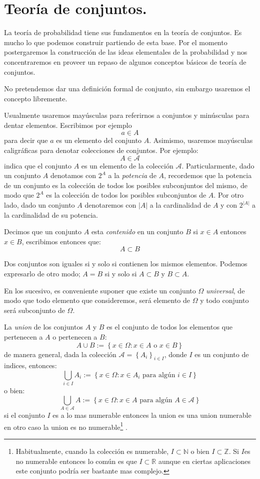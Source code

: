 \documentclass[14pt]{extbook}
\begin{document}
\chapter{Teoría de conjuntos.}

La teoría de probabilidad tiene sus fundamentos en la teoría de conjuntos. Es mucho lo que podemos construir partiendo de esta base. Por el momento postergaremos la construcción de las ideas elementales de la probabilidad y nos concentraremos en proveer un repaso de algunos conceptos básicos de teoría de conjuntos.

No pretendemos dar una definición formal de conjunto, sin embargo usaremos el concepto libremente. 


Usualmente usaremos mayúsculas para referirnos a conjuntos y minúsculas para dentar elementos. Escribimos por ejemplo
$$
a \in A 
$$
para decir que $a$ es un elemento del conjunto $A$. Asimismo, usaremos mayúsculas caligráficas para denotar colecciones de conjuntos. Por ejemplo:
$$
A\in \mathcal{A}
$$
indica que el conjunto $A$ es un elemento de la colección $\mathcal{A}$.
Particularmente, dado un conjunto $A$ denotamos con $2^A$ a la \emph{potencia} de $A$, recordemos que la potencia de un conjunto es la colección de todos los posibles subconjuntos del mismo, de modo que $2^A$ es la colección de todos los posibles subconjuntos de $A$. Por otro lado, dado un conjunto $A$ denotaremos con $\vert A \vert$ a la cardinalidad de $A$ y con $2^{\vert A \vert}$ a la cardinalidad de su potencia.


Decimos que un conjunto $A$ esta \emph{contenido} en un conjunto $B$ si $x\in A$ entonces $x \in B$, escribimos entonces que:
$$
A\subset B
$$

Dos conjuntos son iguales si y solo si contienen los mismos elementos. Podemos expresarlo de otro modo; $A = B$ si y solo si $A\subset B$ y $B \subset A$.

En los sucesivo, es conveniente suponer que existe un conjunto $\Omega$ \emph{universal}, de modo que todo elemento que consideremos, será elemento de $\Omega$ y todo conjunto será subconjunto de $\Omega$.

La \emph{union} de los conjuntos $A$ y $B$ es el conjunto de todos los elementos que pertenecen a $A$ o pertenecen a $B$:
$$
A\cup B := \left\{x \in \Omega: x \in A \text{ o } x \in B\right\}
$$
de manera general, dada la colección $\mathcal{A} = \left\{A_i\right\}_{i\in I}$, donde $I$ es un conjunto de indices, entonces:
$$
\bigcup_{i\in I}A_i := \left\{x \in \Omega: x \in A_i \text{ para algún } i\in I \right\}
$$
\noindent
o bien:
\noindent
$$
\bigcup_{A\in \mathcal{A}}A := \left\{x\in \Omega: x \in A \text{ para algún } A\in \mathcal{A} \right\}
$$
si el conjunto $I$ es a lo mas numerable entonces la union es una union numerable en otro caso la union es no numerable\footnote{Habitualmente, cuando la colección es numerable, $I\subset \mathbb{N}$ o bien $I\subset \mathbb{Z}$. Si $I$es no numerable entonces lo común es que $I\subset\mathbb{R}$ aunque en ciertas aplicaciones este conjunto podría ser bastante mas complejo.} . 
\end{document}
